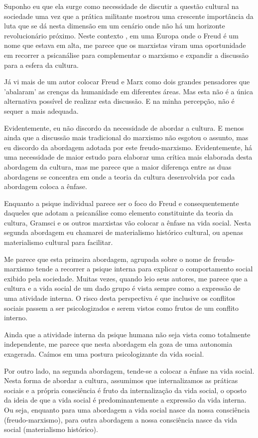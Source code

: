 Suponho eu que ela surge como necessidade de discutir a questão cultural na sociedade uma vez que a prática militante mostrou uma crescente importância da luta que se dá nesta dimensão em um cenário onde não há um horizonte revolucionário próximo.  Neste contexto , em uma Europa onde o Freud é um nome que estava em alta, me parece que os marxistas viram uma oportunidade em recorrer a psicanálise para complementar o marxismo e expandir a discussão para a esfera da cultura.

Já vi mais de um autor colocar Freud e Marx como dois grandes pensadores que 'abalaram' as crenças da humanidade em diferentes áreas. Mas esta não é a única alternativa possível de realizar esta discussão. E na minha percepção, não é sequer a mais adequada.

Evidentemente, eu não discordo da necessidade de abordar a cultura. E menos ainda que a discussão mais tradicional do marxismo não esgotou o assunto, mas eu discordo da abordagem adotada por este freudo-marxismo. Evidentemente, há uma necessidade de maior estudo para elaborar uma crítica mais elaborada desta abordagem da cultura, mas me parece que a maior diferença entre as duas abordagens se concentra em onde a teoria da cultura desenvolvida por cada abordagem coloca a ênfase.

Enquanto a psique individual parece ser o foco do Freud e consequentemente daqueles que adotam a psicanálise como elemento constituinte da teoria da cultura, Gramsci e os outros marxistas vão colocar a ênfase na vida social. Nesta segunda abordagem eu chamarei de materialismo histórico cultural, ou apenas materialismo cultural para facilitar.

Me parece que esta primeira abordagem, agrupada sobre o nome de freudo-marxismo tende a recorrer a psique interna para explicar o comportamento social exibido pela sociedade. Muitas vezes, quando leio seus autores, me parece que a cultura e a vida social de um dado grupo é vista sempre como a expressão de uma atividade interna. O risco desta perspectiva é que inclusive os conflitos sociais passem a ser psicologizados e serem vistos como frutos de um conflito interno.

Ainda que a atividade interna da psique humana não seja vista como totalmente independente, me parece que nesta abordagem ela goza de uma autonomia exagerada. Caímos em uma postura psicologizante da vida social. 

Por outro lado, na segunda abordagem, tende-se a colocar a ênfase na vida social. Nesta forma de abordar a cultura, assumimos que internalizamos as práticas sociais e a própria consciência é fruto da internalização da vida social, o oposto da ideia de que a vida social é predominantemente a expressão da vida interna. Ou seja, enquanto para uma abordagem a vida social nasce da nossa consciência (freudo-marxismo), para outra abordagem a nossa consciência nasce da vida social (materialismo histórico). 


